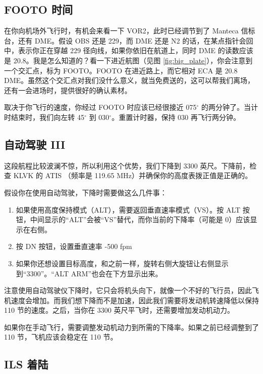 \subsection{FOOTO 时间}

在你向机场外飞行时，有机会来看一下 VOR2，此时已经调节到了 Manteca 信标台，还有 DME。假设 OBS 还是 229，而 DME 还是 N2 的话，在某点指针会回中，表示你正在穿越 229 径向线，如果你依旧在航道上，同时 DME 的读数应该是 20.8。我是怎么知道的？看一下进近航图（见图 \ref{fig:big_plate}），你会注意到一个交汇点，标为 FOOTO。FOOTO 在进近路上，而它相对 ECA 是 20.8 DME。虽然这个交汇点对我们没什么意义，就当免费送的，这可以帮我们离场，还有一会进场时，提供很好的确认素材。

取决于你飞行的速度，你经过 FOOTO 时应该已经很接近 075$^\circ$ 的两分钟了。当计时结束时，我们向左转 45$^\circ$ 到  030$^\circ$。重置计时器，保持 030 再飞行两分钟。

\subsection{自动驾驶 III}

这段航程比较波澜不惊，所以利用这个优势，我们下降到 3300 英尺。下降前，检查 KLVK 的 ATIS （频率是 119.65 MHz）并确保你的高度表拨正值是正确的。

假设你在使用自动驾驶，下降时需要做这么几件事：

\begin{enumerate}
\item 如果使用高度保持模式（ALT），需要返回垂直速率模式（VS）。按 ALT 按钮，中间显示的“ALT”会被“VS”替代，而你当前的下降率（可能是 0）应该显示在右侧。
\item 按 DN 按钮，设置垂直速率 -500 fpm
\item 如果你还想设置目标高度，和之前一样，旋转右侧大旋钮让右侧显示到“3300”。“ALT ARM”也会在下方显示出来。
\end{enumerate}

注意使用自动驾驶仪下降时，它只会将机头向下，就像一个不好的飞行员，因此飞机速度会增加。而我们想下降而不是加速，因此我们需要将发动机转速降低以保持 110 节的速度。之后，当你在 3300 英尺平飞时，还需要增加发动机动力。

如果你在手动飞行，需要调整发动机动力到所需的下降率。如果之前已经调整到了 110 节，飞机应该会稳定在 110 节。

\subsection{ILS 着陆}

